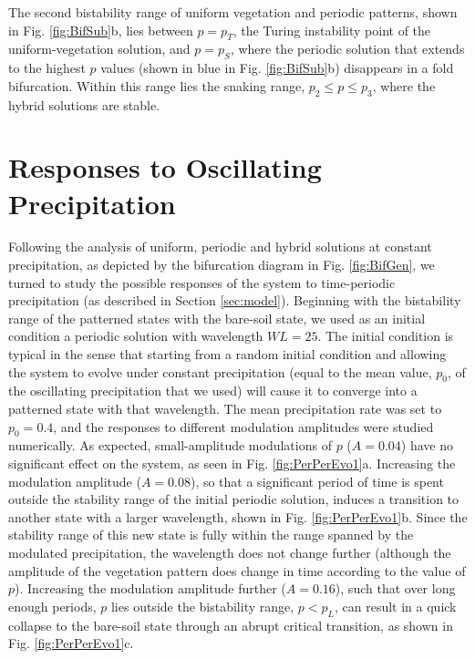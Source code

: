 \documentclass[aps,prl,preprint,superscriptaddress,floatfix]{revtex4-1}
\begin{document}
The second bistability range of uniform vegetation and periodic patterns, shown in Fig. \ref{fig:BifSub}b,
lies between $p=p_T$, the Turing instability point of the uniform-vegetation solution, and $p=p_S$, 
where the periodic solution that extends to the highest $p$ values (shown in blue in Fig. \ref{fig:BifSub}b) disappears in a fold bifurcation.
Within this range lies the snaking range, $p_2\le p\le p_3$, where the hybrid solutions are stable.

\section{Responses to Oscillating Precipitation} \label{perper}

Following the analysis of uniform, periodic and hybrid solutions at constant precipitation, as depicted by the bifurcation diagram in Fig. \ref{fig:BifGen},
we turned to study the possible responses of the system to time-periodic precipitation (as described in Section \ref{sec:model}).
Beginning with the bistability range of the patterned states with the bare-soil state, we used as an initial condition a periodic solution with wavelength $WL=25$. 
The initial condition is typical in the sense that starting from a random initial condition and allowing the system to evolve under constant precipitation 
(equal to the mean value, $p_0$, of the oscillating precipitation that we used) will cause it to converge into a patterned state with that wavelength.
The mean precipitation rate was set to $p_0=0.4$, and the responses to different modulation amplitudes were studied numerically.
As expected, small-amplitude modulations of $p$ ($A=0.04$) have no significant effect on the system, as seen in Fig. \ref{fig:PerPerEvo1}a.
Increasing the modulation amplitude ($A=0.08$), so that a significant period of time is spent outside the stability range of the initial periodic solution, induces a transition to another state with a larger wavelength, shown in Fig. \ref{fig:PerPerEvo1}b.
Since the stability range of this new state is fully within the range spanned by the modulated precipitation, the wavelength does not change further (although the amplitude of the vegetation pattern does change in time according to the value of $p$).
Increasing the modulation amplitude further ($A=0.16$), such that over long enough periods, $p$ lies outside the bistability range, $p<p_L$, can result in a quick collapse to the bare-soil state through an abrupt critical transition, as shown in Fig. \ref{fig:PerPerEvo1}c.
\end{document}
